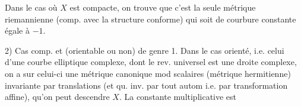 
Dans le cas où $X$ est compacte, on trouve que c'est la seule métrique riemannienne (comp. avec la structure conforme) qui soit de courbure constante égale à $-1$.

2) Cas  comp. et (orientable ou non) de genre 1. Dans le cas orienté, i.e. celui d'une courbe elliptique complexe, dont le rev. universel est une droite complexe, on a sur celui-ci une métrique canonique mod scalaires (métrique hermitienne) invariante par translations (et qu. inv. par tout autom i.e. par transformation affine), qu'on peut descendre  $X$. La constante multiplicative est

